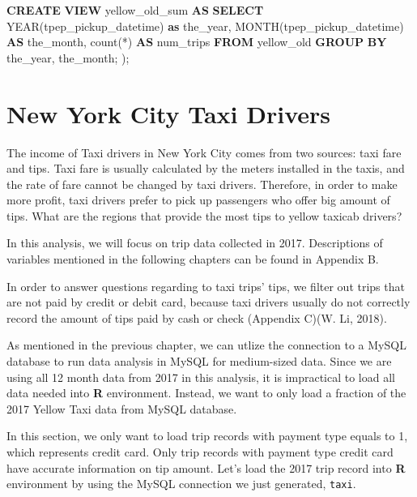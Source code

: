 \documentclass[12pt,twoside]{reedthesis}
\newenvironment{Shaded}{\begin{snugshade}}{\end{snugshade}}
\newcommand{\KeywordTok}[1]{\textcolor[rgb]{0.13,0.29,0.53}{\textbf{#1}}}
\newcommand{\DataTypeTok}[1]{\textcolor[rgb]{0.13,0.29,0.53}{#1}}
\newcommand{\DecValTok}[1]{\textcolor[rgb]{0.00,0.00,0.81}{#1}}
\newcommand{\StringTok}[1]{\textcolor[rgb]{0.31,0.60,0.02}{#1}}
\newcommand{\OtherTok}[1]{\textcolor[rgb]{0.56,0.35,0.01}{#1}}
\newcommand{\FunctionTok}[1]{\textcolor[rgb]{0.00,0.00,0.00}{#1}}
\newcommand{\OperatorTok}[1]{\textcolor[rgb]{0.81,0.36,0.00}{\textbf{#1}}}
\newcommand{\NormalTok}[1]{#1}
\theoremstyle{definition}
\theoremstyle{definition}
\theoremstyle{definition}
\theoremstyle{remark}
\begin{document}
\begin{Shaded}
\begin{Highlighting}[]
\KeywordTok{CREATE} \KeywordTok{VIEW}\NormalTok{ yellow_old_sum }\KeywordTok{AS} 
\KeywordTok{SELECT} \DataTypeTok{YEAR}\NormalTok{(tpep_pickup_datetime) }\KeywordTok{as}\NormalTok{ the_year, }\DataTypeTok{MONTH}\NormalTok{(tpep_pickup_datetime) }\KeywordTok{AS}\NormalTok{ the_month, }\FunctionTok{count}\NormalTok{(*) }\KeywordTok{AS}\NormalTok{ num_trips}
  \KeywordTok{FROM}\NormalTok{ yellow_old}
  \KeywordTok{GROUP} \KeywordTok{BY}\NormalTok{ the_year, the_month; }
\NormalTok{); }
\end{Highlighting}
\end{Shaded}
\chapter{New York City Taxi Drivers}\label{chapter3}

The income of Taxi drivers in New York City comes from two sources: taxi
fare and tips. Taxi fare is usually calculated by the meters installed
in the taxis, and the rate of fare cannot be changed by taxi drivers.
Therefore, in order to make more profit, taxi drivers prefer to pick up
passengers who offer big amount of tips. What are the regions that
provide the most tips to yellow taxicab drivers?

In this analysis, we will focus on trip data collected in 2017.
Descriptions of variables mentioned in the following chapters can be
found in Appendix B.

In order to answer questions regarding to taxi trips' tips, we filter
out trips that are not paid by credit or debit card, because taxi
drivers usually do not correctly record the amount of tips paid by cash
or check (Appendix C)(W. Li, 2018).

As mentioned in the previous chapter, we can utlize the connection to a
MySQL database to run data analysis in MySQL for medium-sized data.
Since we are using all 12 month data from 2017 in this analysis, it is
impractical to load all data needed into \textbf{R} environment.
Instead, we want to only load a fraction of the 2017 Yellow Taxi data
from MySQL database.

In this section, we only want to load trip records with payment type
equals to 1, which represents credit card. Only trip records with
payment type credit card have accurate information on tip amount. Let's
load the 2017 trip record into \textbf{R} environment by using the MySQL
connection we just generated, \texttt{taxi}.
\begin{Shaded}
\end{Shaded}
\end{document}
